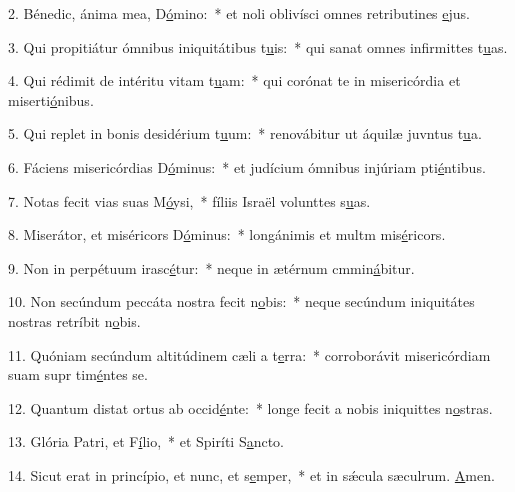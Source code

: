 2. Bénedic, ánima mea, D\uline{ó}mino:~* et noli oblivísci omnes retributines \uline{e}jus.\par 
3. Qui propitiátur ómnibus iniquitátibus t\uline{u}is:~* qui sanat omnes infirmittes t\uline{u}as.\par 
4. Qui rédimit de intéritu vitam t\uline{u}am:~* qui corónat te in misericórdia et miserti\uline{ó}nibus.\par 
5. Qui replet in bonis desidérium t\uline{u}um:~* renovábitur ut áquilæ juvntus t\uline{u}a.\par 
6. Fáciens misericórdias D\uline{ó}minus:~* et judícium ómnibus injúriam pti\uline{é}ntibus.\par 
7. Notas fecit vias suas M\uline{ó}ysi,~* fíliis Israël volunttes s\uline{u}as.\par 
8. Miserátor, et miséricors D\uline{ó}minus:~* longánimis et multm mis\uline{é}ricors.\par 
9. Non in perpétuum irasc\uline{é}tur:~* neque in ætérnum cmmin\uline{á}bitur.\par 
10. Non secúndum peccáta nostra fecit n\uline{o}bis:~* neque secúndum iniquitátes nostras retríbit n\uline{o}bis.\par 
11. Quóniam secúndum altitúdinem cæli a t\uline{e}rra:~* corroborávit misericórdiam suam supr tim\uline{é}ntes se.\par 
12. Quantum distat ortus ab occid\uline{é}nte:~* longe fecit a nobis iniquittes n\uline{o}stras.\par 
13. Glória Patri, et F\uline{í}lio,~* et Spiríti S\uline{a}ncto.\par 
14. Sicut erat in princípio, et nunc, et s\uline{e}mper,~* et in sǽcula sæculrum. \uline{A}men.\par 
